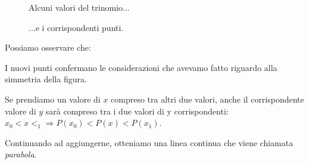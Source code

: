 \begin{figure}[h]
\begin{minipage}[]{.58\textwidth}
\begin{center}
\begin{tabular}{r|l}
   \end{tabular}
  \caption{Alcuni valori del trinomio...} \label{tab:tabella1}
  \end{center}
\end{minipage}
\hfill
\begin{minipage}[]{.38\textwidth}
\begin{center}
\begin{inaccessibleblock}
  \puntib
  \caption{...e i corrispondenti punti.}\label{fig:trinomio1}
\end{inaccessibleblock}
\end{center}
\end{minipage}
\end{figure}


Possiamo osservare che:

\begin{enumerate*}
 \item I nuovi punti confermano le considerazioni che avevamo fatto riguardo
 alla simmetria della figura.
 \item Se prendiamo un valore di \(x\) compreso tra altri due valori, anche
 il  corrispondente valore di \(y\) sarà compreso tra i due valori di y
 corrispondenti: \\
 \(x_0 < x <_1 \Rightarrow P(x_0) < P(x) < P(x_1)\).
\end{enumerate*}

Continuando ad aggiungerne, otteniamo una linea continua che viene
chiamata \emph{parabola}.

